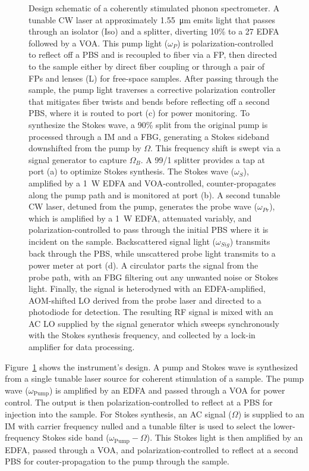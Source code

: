 \begin{figure}[htbp]
{Design schematic of a coherently stimulated phonon spectrometer. A tunable \ac{CW} laser at approximately \SI{1.55}{\micro\meter} emits light that passes through an isolator (Iso) and a splitter, diverting 10\% to a \SI{27}{\dBm} \ac{EDFA} followed by a \ac{VOA}. This pump light (\(\omega_P\)) is polarization-controlled to reflect off a \ac{PBS} and is recoupled to fiber via a \ac{FP}, then directed to the sample either by direct fiber coupling or through a pair of \ac{FP}s and lenses (L) for free-space samples. After passing through the sample, the pump light traverses a corrective polarization controller that mitigates fiber twists and bends before reflecting off a second \ac{PBS}, where it is routed to port (c) for power monitoring. To synthesize the Stokes wave, a 90\% split from the original pump is processed through a \ac{IM} and a \ac{FBG}, generating a Stokes sideband downshifted from the pump by \(\Omega\). This frequency shift is swept via a signal generator to capture \(\Omega_B\). A 99/1 splitter provides a tap at port (a) to optimize Stokes synthesis. The Stokes wave (\(\omega_S\)), amplified by a \SI{1}{\watt} \ac{EDFA} and \ac{VOA}-controlled, counter-propagates along the pump path and is monitored at port (b). A second tunable \ac{CW} laser, detuned from the pump, generates the probe wave (\(\omega_{Pr}\)), which is amplified by a \SI{1}{\watt} \ac{EDFA}, attenuated variably, and polarization-controlled to pass through the initial \ac{PBS} where it is incident on the sample. Backscattered signal light (\(\omega_{Sig}\)) transmits back through the \ac{PBS}, while unscattered probe light transmits to a power meter at port (d). A circulator parts the signal from the probe path, with an \ac{FBG} filtering out any unwanted noise or Stokes light. Finally, the signal is heterodyned with an \ac{EDFA}-amplified, \ac{AOM}-shifted \ac{LO} derived from the probe laser and directed to a photodiode for detection. The resulting \ac{RF} signal is mixed with an \ac{AC} \ac{LO} supplied by the signal generator which sweeps synchronously with the Stokes synthesis frequency, and collected by a lock-in amplifier for data processing.
}
\label{fig:Instrument Design}
\end{figure}

Figure~\ref{fig:Instrument Design} shows the instrument’s design. A pump and Stokes wave is synthesized from a single tunable laser source for coherent stimulation of a sample. The pump wave (\(\omega_{\mathrm{Pump}}\)) is amplified by an \ac{EDFA} and passed through a \ac{VOA} for power control. The output is then polarization-controlled to reflect at a \ac{PBS} for injection into the sample. For Stokes synthesis, an \ac{AC} signal (\(\Omega\)) is supplied to an \ac{IM} with carrier frequency nulled and a tunable filter is used to select the lower-frequency Stokes side band (\(\omega_{\mathrm{Pump}} - \Omega\)). This Stokes light is then amplified by an \ac{EDFA}, passed through a \ac{VOA}, and polarization-controlled to reflect at a second \ac{PBS} for couter-propagation to the pump through the sample.

